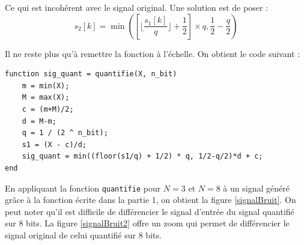 \documentclass[french]{article}
\begin{document}
Ce qui est incohérent avec le signal original. Une solution est de poser :
\begin{equation}
  s_2[k] = \min\left(\left[\lfloor \frac{s_1[k]}{q} \rfloor + \frac{1}{2}\right] \times q, \frac{1}{2} - \frac{q}{2}\right)
\end{equation}

Il ne reste plus qu'à remettre la fonction à l'échelle. On obtient le code suivant :

\lstset{language=matlab}
\begin{lstlisting}
function sig_quant = quantifie(X, n_bit)
    m = min(X);
    M = max(X);
    c = (m+M)/2;
    d = M-m;
    q = 1 / (2 ^ n_bit);
    s1 = (X - c)/d;
    sig_quant = min((floor(s1/q) + 1/2) * q, 1/2-q/2)*d + c;
end
\end{lstlisting}
En appliquant la fonction \verb`quantifie` pour $N=3$ et $N=8$ à un signal généré grâce à la fonction écrite dans la partie 1, on obtient la figure \ref{signalBruit}. On peut noter qu'il est difficile de différencier le signal d'entrée du signal quantifié sur 8 bits. La figure \ref{signalBruit2} offre un zoom qui permet de différencier le signal original de celui quantifié sur 8 bits.
\end{document}
